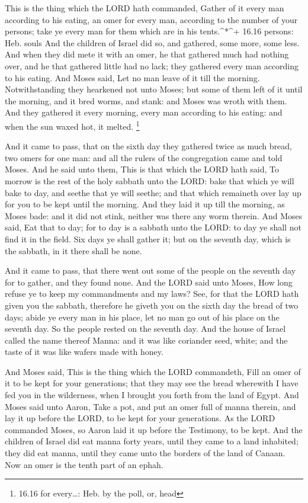  This is the thing which the LORD hath commanded, Gather of
it every man according to his eating, an omer for every man, according
to the number of your persons; take ye every man for them which are in
his tents.\^{}*\^{}+ 16.16 persons: Heb. souls  And the
children of Israel did so, and gathered, some more, some less.
 And when they did mete it with an omer, he that gathered
much had nothing over, and he that gathered little had no lack; they
gathered every man according to his eating.  And Moses
said, Let no man leave of it till the morning. 
Notwithstanding they hearkened not unto Moses; but some of them left of
it until the morning, and it bred worms, and stank: and Moses was wroth
with them.  And they gathered it every morning, every man
according to his eating: and when the sun waxed hot, it melted.
\footnote{16.16 for every\ldots: Heb. by the poll, or, head}

 And it came to pass, that on the sixth day they gathered
twice as much bread, two omers for one man: and all the rulers of the
congregation came and told Moses.  And he said unto them,
This is that which the LORD hath said, To morrow is the rest of the holy
sabbath unto the LORD: bake that which ye will bake to day, and seethe
that ye will seethe; and that which remaineth over lay up for you to be
kept until the morning.  And they laid it up till the
morning, as Moses bade: and it did not stink, neither was there any worm
therein.  And Moses said, Eat that to day; for to day is a
sabbath unto the LORD: to day ye shall not find it in the field.
 Six days ye shall gather it; but on the seventh day, which
is the sabbath, in it there shall be none.

 And it came to pass, that there went out some of the
people on the seventh day for to gather, and they found none.
 And the LORD said unto Moses, How long refuse ye to keep
my commandments and my laws?  See, for that the LORD hath
given you the sabbath, therefore he giveth you on the sixth day the
bread of two days; abide ye every man in his place, let no man go out of
his place on the seventh day.  So the people rested on the
seventh day.  And the house of Israel called the name
thereof Manna: and it was like coriander seed, white; and the taste of
it was like wafers made with honey.

 And Moses said, This is the thing which the LORD
commandeth, Fill an omer of it to be kept for your generations; that
they may see the bread wherewith I have fed you in the wilderness, when
I brought you forth from the land of Egypt.  And Moses said
unto Aaron, Take a pot, and put an omer full of manna therein, and lay
it up before the LORD, to be kept for your generations.  As
the LORD commanded Moses, so Aaron laid it up before the Testimony, to
be kept.  And the children of Israel did eat manna forty
years, until they came to a land inhabited; they did eat manna, until
they came unto the borders of the land of Canaan.  Now an
omer is the tenth part of an ephah.

